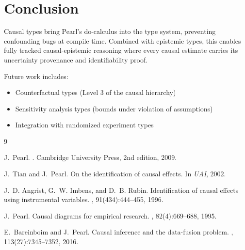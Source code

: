 \documentclass[11pt]{article}
\begin{document}
\section{Conclusion}

Causal types bring Pearl's do-calculus into the type system, preventing confounding bugs at compile time. Combined with epistemic types, this enables fully tracked causal-epistemic reasoning where every causal estimate carries its uncertainty provenance and identifiability proof.

Future work includes:
\begin{itemize}
\item Counterfactual types (Level 3 of the causal hierarchy)
\item Sensitivity analysis types (bounds under violation of assumptions)
\item Integration with randomized experiment types
\end{itemize}

\begin{thebibliography}{9}

J.~Pearl.
.
\newblock Cambridge University Press, 2nd edition, 2009.

J.~Tian and J.~Pearl.
\newblock On the identification of causal effects.
\newblock In {\em UAI}, 2002.

J.~D. Angrist, G.~W. Imbens, and D.~B. Rubin.
\newblock Identification of causal effects using instrumental variables.
, 91(434):444--455, 1996.

J.~Pearl.
\newblock Causal diagrams for empirical research.
, 82(4):669--688, 1995.

E.~Bareinboim and J.~Pearl.
\newblock Causal inference and the data-fusion problem.
, 113(27):7345--7352, 2016.

\end{thebibliography}
\end{document}
